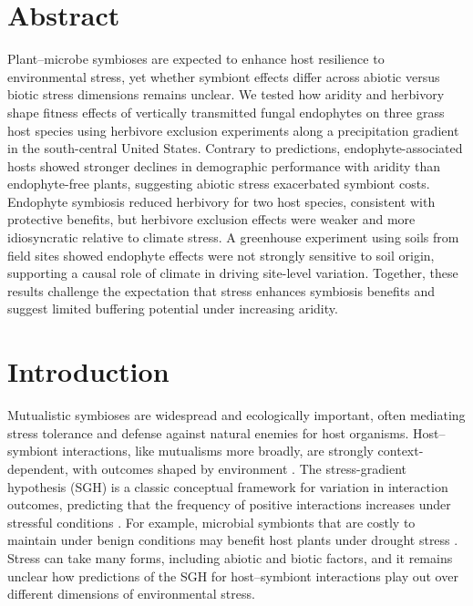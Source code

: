 \documentclass[12pt]{article}\usepackage[]{graphicx}\usepackage[dvipsnames]{xcolor}
\begin{document}
\section*{Abstract}
Plant–microbe symbioses are expected to enhance host resilience to environmental stress, yet whether symbiont effects differ across abiotic versus biotic stress dimensions remains unclear. 
We tested how aridity and herbivory shape fitness effects of vertically transmitted fungal endophytes on three grass host species using herbivore exclusion experiments along a precipitation gradient in the south-central United States. 
Contrary to predictions, endophyte-associated hosts showed stronger declines in demographic performance with aridity than endophyte-free plants, suggesting abiotic stress exacerbated symbiont costs. 
Endophyte symbiosis reduced herbivory for two host species, consistent with protective benefits, but herbivore exclusion effects were weaker and more idiosyncratic relative to climate stress. 
A greenhouse experiment using soils from field sites showed endophyte effects were not strongly sensitive to soil origin, supporting a causal role of climate in driving site-level variation. 
Together, these results challenge the expectation that stress enhances symbiosis benefits and suggest limited buffering potential under increasing aridity.
\bigskip

\newpage
\section*{Introduction}
Mutualistic symbioses are widespread and ecologically important, often mediating stress tolerance and defense against natural enemies for host organisms. 
Host--symbiont interactions, like mutualisms more broadly, are strongly context-dependent, with outcomes shaped by environment \citep{hoeksema2015context, bronstein1994conditional,hoang2024impacts,rudgers2020climate}. 
The stress-gradient hypothesis (SGH) is a classic conceptual framework for variation in interaction outcomes, predicting that the frequency of positive interactions increases under stressful conditions \citep{louthan2015and,bertness1994positive,holmgren2010strong,maestre2009refining}.
For example, microbial symbionts that are costly to maintain under benign conditions may benefit host plants under drought stress  \citep{giauque2019endophyte}. 
Stress can take many forms, including abiotic and biotic factors, and it remains unclear how predictions of the SGH for host--symbiont interactions play out over different dimensions of environmental stress. 
\end{document}
